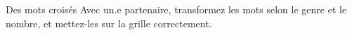 \begin{frame}{Des mots croisés}
  Avec un.e partenaire, transformez les mots selon le genre et le nombre, et mettez-les sur la grille correctement.
  \begin{center}
  \end{center}
\end{frame}